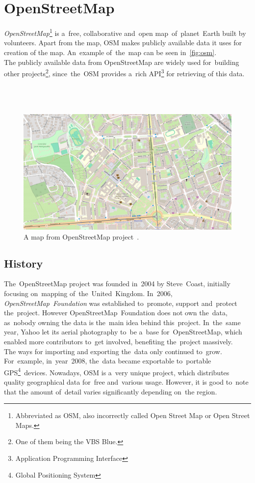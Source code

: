 \section{OpenStreetMap}
\textit{OpenStreetMap}\footnote{Abbreviated as OSM, also incorrectly called Open Street Map or Open Street Maps.} is a~free, collaborative and~open map~of~planet~Earth built by volunteers. Apart from the map, OSM makes publicly available data it uses for creation of the map. An~example of~the~map can be seen in~\autoref{fig:osm}. \\ 
The publicly available data from OpenStreetMap are widely used for~building other projects\footnote{One of them being the VBS Blue.}, since~the~OSM provides a~rich API\footnote{Application Programming Interface} for retrieving of this data. \cite{osm-foundation-about, ramm}
\\
\\
\\
\\
\begin{figure}[h]
    \centering
    \includegraphics[width=1\linewidth]{osm.png}
    \caption[A map from OpenStreetMap project]{A map from OpenStreetMap project~\cite{osm-foundation-1}.}
    \label{fig:osm}
\end{figure}

\subsection{History}
The~OpenStreetMap project was founded in~2004 by Steve~Coast, initially focusing on~mapping of~the~United~Kingdom. In~2006, \textit{OpenStreetMap~Foundation} was established to~promote, support and~protect the~project. However OpenStreetMap~Foundation does not own the~data, as~nobody owning the data is the~main idea behind this~project. In~the~same year, Yahoo let its aerial photography to~be a~base for~OpenStreetMap, which enabled more contributors to~get involved, benefiting the~project massively. \\
The ways for importing and exporting the~data only continued to~grow. For~example, in~year~2008, the~data became exportable to~portable GPS\footnote{Global Positioning System}~devices. Nowadays, OSM is a~very unique project, which distributes quality geographical data for~free and~various usage. However, it is good to~note that the amount of~detail varies significantly depending on~the region.

